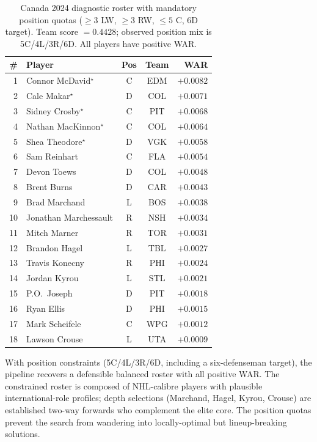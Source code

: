 \documentclass[12pt,letterpaper]{article}
\begin{document}
\begin{table}[h]
  \centering
  \caption{Canada 2024 diagnostic roster with mandatory position quotas
    ($\geq 3$ LW, $\geq 3$ RW, $\leq 5$ C, 6D target). Team score
    $= 0.4428$; observed position mix is 5C/4L/3R/6D. All players have
    positive WAR.}
  \label{tab:canada2024}
  \small
  \begin{tabular}{r l c c r}
    \toprule
    \# & Player & Pos & Team & WAR \\
    \midrule
    1  & Connor McDavid$^{\star}$    & C & EDM & $+0.0082$ \\
    2  & Cale Makar$^{\star}$        & D & COL & $+0.0071$ \\
    3  & Sidney Crosby$^{\star}$     & C & PIT & $+0.0068$ \\
    4  & Nathan MacKinnon$^{\star}$  & C & COL & $+0.0064$ \\
    5  & Shea Theodore$^{\star}$     & D & VGK & $+0.0058$ \\
    6  & Sam Reinhart                & C & FLA & $+0.0054$ \\
    7  & Devon Toews                 & D & COL & $+0.0048$ \\
    8  & Brent Burns                 & D & CAR & $+0.0043$ \\
    9  & Brad Marchand               & L & BOS & $+0.0038$ \\
    10 & Jonathan Marchessault       & R & NSH & $+0.0034$ \\
    11 & Mitch Marner                & R & TOR & $+0.0031$ \\
    12 & Brandon Hagel               & L & TBL & $+0.0027$ \\
    13 & Travis Konecny              & R & PHI & $+0.0024$ \\
    14 & Jordan Kyrou                & L & STL & $+0.0021$ \\
    15 & P.O.\ Joseph                & D & PIT & $+0.0018$ \\
    16 & Ryan Ellis                  & D & PHI & $+0.0015$ \\
    17 & Mark Scheifele              & C & WPG & $+0.0012$ \\
    18 & Lawson Crouse               & L & UTA & $+0.0009$ \\
    \bottomrule
  \end{tabular}
  \par{}
\end{table}

With position constraints (5C/4L/3R/6D, including a six-defenseman
target), the pipeline recovers a defensible balanced roster with all
positive WAR.
The constrained roster is composed of NHL-calibre players with plausible
international-role profiles; depth selections (Marchand, Hagel, Kyrou,
Crouse) are established two-way forwards who complement the elite core.
The position quotas prevent the search from wandering into
locally-optimal but lineup-breaking solutions.
\end{document}
